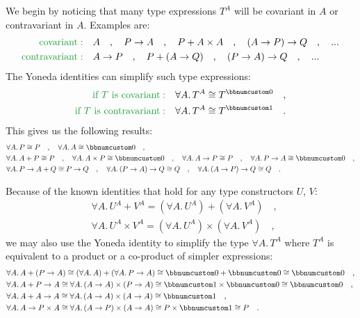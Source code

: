 We begin by noticing that many type expressions $T^{A}$ will be covariant
in $A$ or contravariant in $A$. Examples are:
\begin{align*}
{\color{greenunder}\text{covariant}:}\quad & A\quad,\quad P\rightarrow A\quad,\quad P+A\times A\quad,\quad(A\rightarrow P)\rightarrow Q\quad,\quad...\\
{\color{greenunder}\text{contravariant}:}\quad & A\rightarrow P\quad,\quad P+(A\rightarrow Q)\quad,\quad(P\rightarrow A)\rightarrow Q\quad,\quad...
\end{align*}
The Yoneda identities can simplify such type expressions:
\begin{align*}
{\color{greenunder}\text{if }T\text{ is covariant}:}\quad & \forall A.\,T^{A}\cong T^{\bbnum 0}\quad,\\
{\color{greenunder}\text{if }T\text{ is contravariant}:}\quad & \forall A.\,T^{A}\cong T^{\bbnum 1}\quad.
\end{align*}
This gives us the following results:
\begin{align*}
 & \forall A.\,P\cong P\quad,\quad\forall A.\,A\cong\bbnum 0\quad,\\
 & \forall A.\,A+P\cong P\quad,\quad\forall A.\,A\times P\cong\bbnum 0\quad,\quad\forall A.\,A\rightarrow P\cong P\quad,\quad\forall A.\,P\rightarrow A\cong\bbnum 0\quad,\\
 & \forall A.\,P\rightarrow A+Q\cong P\rightarrow Q\quad,\quad\forall A.\,(P\rightarrow A)\rightarrow Q\cong Q\quad,\quad\forall A.\,(A\rightarrow P)\rightarrow Q\cong Q\quad.
\end{align*}

Because of the known identities that hold for any type constructors
$U$, $V$:
\begin{align*}
 & \forall A.\,U^{A}+V^{A}=(\forall A.\,U^{A})+(\forall A.\,V^{A})\quad,\\
 & \forall A.\,U^{A}\times V^{A}=(\forall A.\,U^{A})\times(\forall A.\,V^{A})\quad,
\end{align*}
we may also use the Yoneda identity to simplify the type $\forall A.\,T^{A}$
where $T^{A}$ is equivalent to a product or a co-product of simpler
expressions:
\begin{align*}
 & \forall A.\,A+(P\rightarrow A)\cong(\forall A.\,A)+(\forall A.\,P\rightarrow A)\cong\bbnum 0+\bbnum 0\cong\bbnum 0\quad,\\
 & \forall A.\,A+P\rightarrow A\cong\forall A.\,(A\rightarrow A)\times(P\rightarrow A)\cong\bbnum 1\times\bbnum 0\cong\bbnum 0\quad,\\
 & \forall A.\,A+A\rightarrow A\cong\forall A.\,(A\rightarrow A)\times(A\rightarrow A)\cong\bbnum 1\quad,\\
 & \forall A.\,A\rightarrow P\times A\cong\forall A.\,(A\rightarrow P)\times(A\rightarrow A)\cong P\times\bbnum 1\cong P\quad.
\end{align*}

